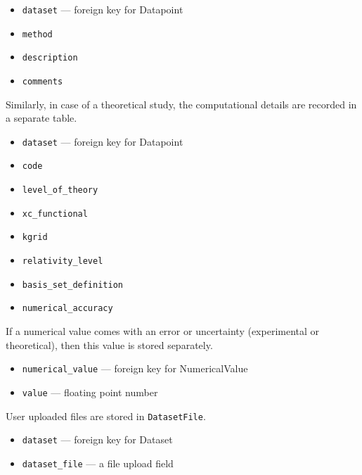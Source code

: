 \documentclass{article}
\begin{document}
\begin{tcolorbox}[colback=green!5,colframe=green!40!black,title=ExperimentalDetails(Base)]
  \begin{itemize}
  \item \texttt{dataset} --- foreign key for Datapoint
  \item \texttt{method}
  \item \texttt{description}
  \item \texttt{comments}
  \end{itemize}
\end{tcolorbox}

Similarly, in case of a theoretical study, the computational details are recorded in a separate table.
\begin{tcolorbox}[colback=green!5,colframe=green!40!black,title=ComputationalDetails(Base)]
  \begin{itemize}
  \item \texttt{dataset} --- foreign key for Datapoint
  \item \texttt{code}
  \item \texttt{level\_of\_theory}
  \item \texttt{xc\_functional}
  \item \texttt{kgrid}
  \item \texttt{relativity\_level}
  \item \texttt{basis\_set\_definition}
  \item \texttt{numerical\_accuracy}
  \end{itemize}
\end{tcolorbox}

If a numerical value comes with an error or uncertainty (experimental or theoretical), then this value is stored separately.
\begin{tcolorbox}[colback=green!5,colframe=green!40!black,title=Error(Base)]
  \begin{itemize}
  \item \texttt{numerical\_value} --- foreign key for NumericalValue
  \item \texttt{value} --- floating point number
  \end{itemize}
\end{tcolorbox}

User uploaded files are stored in \texttt{DatasetFile}.
\begin{tcolorbox}[colback=green!5,colframe=green!40!black,title=DatasetFile(Base)]
  \begin{itemize}
  \item \texttt{dataset} --- foreign key for Dataset
  \item \texttt{dataset\_file} --- a file upload field
  \end{itemize}
\end{tcolorbox}
\end{document}
